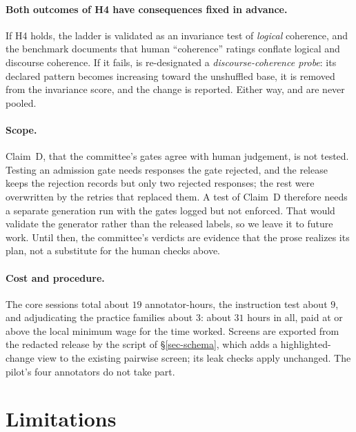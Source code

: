 \paragraph{Both outcomes of H4 have consequences fixed in advance.} If H4 holds, the  ladder is
validated as an invariance test of \emph{logical} coherence, and the benchmark documents that human ``coherence''
ratings conflate logical and discourse coherence. If it fails,  is re-designated a
\emph{discourse-coherence probe}: its declared pattern becomes increasing toward the unshuffled base, it is removed
from the invariance score, and the change is reported. Either way,  and  are never
pooled.

\paragraph{Scope.}\label{sec-study-scope} Claim~D, that the committee's gates agree with human judgement, is not
tested. Testing an admission gate needs responses the gate rejected, and the release keeps the rejection records but
only two rejected responses; the rest were overwritten by the retries that replaced them. A test of Claim~D therefore
needs a separate generation run with the gates logged but not enforced. That would validate the generator rather
than the released labels, so we leave it to future work. Until then, the committee's verdicts are evidence that the
prose realizes its plan, not a substitute for the human checks above.

\paragraph{Cost and procedure.} The core sessions total about $19$ annotator-hours, the instruction test about $9$,
and adjudicating the practice families about $3$: about $31$ hours in all, paid at or above the local minimum wage
for the time worked. Screens are exported from the redacted release by the script of \S\ref{sec-schema}, which adds
a highlighted-change view to the existing pairwise screen; its leak checks apply unchanged. The pilot's four
annotators do not take part. 

\section{Limitations}
\label{sec-limitations}

